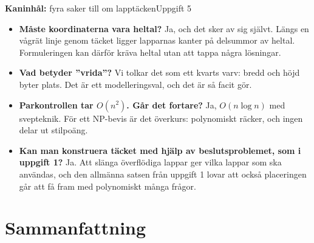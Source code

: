 \documentclass[aspectratio=169,10pt]{beamer}
\newcommand{\rabbit}{\textcolor{warnorange}{\textbf{Kaninhål:}} }
\begin{document}
\begin{frame}{\rabbit fyra saker till om lapptäcken}{Uppgift 5}
  \begin{itemize}
    \item<1-> \textbf{Måste koordinaterna vara heltal?} Ja, och det sker av sig självt. Längs en vågrät linje genom täcket ligger lapparnas kanter på delsummor av heltal. Formuleringen kan därför kräva heltal utan att tappa några lösningar.
    \item<2-> \textbf{Vad betyder ''vrida''?} Vi tolkar det som ett kvarts varv: bredd och höjd byter plats. Det är ett modelleringsval, och det är så facit gör.
    \item<3-> \textbf{Parkontrollen tar $O(n^2)$. Går det fortare?} Ja, $O(n\log n)$ med svepteknik. För ett NP-bevis är det överkurs: polynomiskt räcker, och ingen delar ut stilpoäng.
    \item<4-> \textbf{Kan man konstruera täcket med hjälp av beslutsproblemet, som i uppgift 1?} Ja. Att slänga överflödiga lappar ger vilka lappar som ska användas, och den allmänna satsen från uppgift 1 lovar att också placeringen går att få fram med polynomiskt många frågor.
  \end{itemize}
\end{frame}

\section{Sammanfattning}
\end{document}
